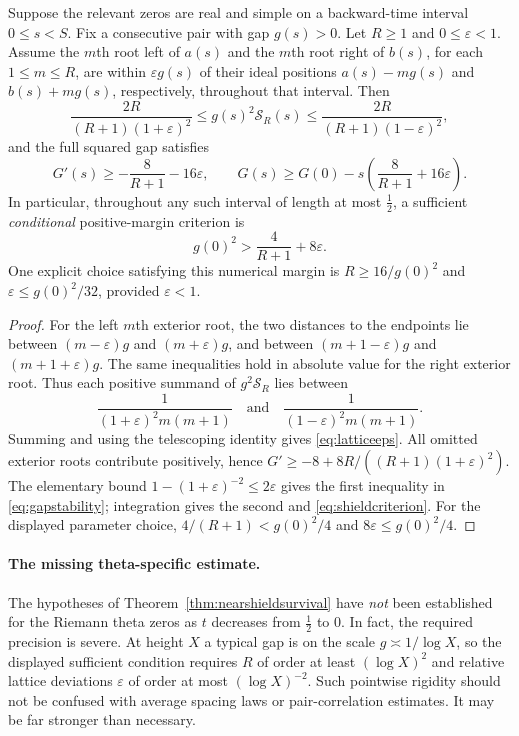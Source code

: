 \begin{theorem}
\label{thm:nearshieldsurvival}
Suppose the relevant zeros are real and simple
on a backward-time interval $0\le s<S$.
Fix a consecutive pair with gap $g(s)>0$.
Let $R\ge1$ and $0\le\varepsilon<1$.
Assume the $m$th root left of $a(s)$
and the $m$th root right of $b(s)$,
for each $1\le m\le R$, are within
$\varepsilon g(s)$ of their ideal
positions $a(s)-mg(s)$ and $b(s)+mg(s)$,
respectively, throughout that interval.
Then
\begin{equation}
\frac{2R}{(R+1)(1+\varepsilon)^2}
\le g(s)^2\mathcal S_R(s)
\le\frac{2R}{(R+1)(1-\varepsilon)^2},
\label{eq:latticeeps}
\end{equation}
and the full squared gap satisfies
\begin{equation}
\boxed{
G'(s)\ge-\frac8{R+1}-16\varepsilon,\qquad
G(s)\ge G(0)-s
\left(\frac8{R+1}+16\varepsilon\right).
}
\label{eq:gapstability}
\end{equation}
In particular, throughout any such interval of
length at most $\tfrac12$, a sufficient
\emph{conditional} positive-margin criterion is
\begin{equation}
\boxed{g(0)^2>\frac4{R+1}+8\varepsilon.}
\label{eq:shieldcriterion}
\end{equation}
One explicit choice satisfying this numerical margin is
$R\ge16/g(0)^2$ and
$\varepsilon\le g(0)^2/32$, provided $\varepsilon<1$.
\end{theorem}
\begin{proof}
For the left $m$th exterior root, the two
distances to the endpoints lie between
$(m-\varepsilon)g$ and $(m+\varepsilon)g$,
and between $(m+1-\varepsilon)g$ and
$(m+1+\varepsilon)g$.
The same inequalities hold in absolute value
for the right exterior root. Thus each
positive summand of $g^2\mathcal S_R$
lies between
\[
\frac{1}{(1+\varepsilon)^2m(m+1)}
\quad\text{and}\quad
\frac{1}{(1-\varepsilon)^2m(m+1)}.
\]
Summing and using the telescoping identity
gives \eqref{eq:latticeeps}.
All omitted exterior roots contribute
positively, hence
$G'\ge-8+8R/((R+1)(1+\varepsilon)^2)$.
The elementary bound
$1-(1+\varepsilon)^{-2}\le2\varepsilon$
gives the first inequality in
\eqref{eq:gapstability}; integration gives
the second and \eqref{eq:shieldcriterion}.
For the displayed parameter choice,
$4/(R+1)<g(0)^2/4$ and
$8\varepsilon\le g(0)^2/4$.
\end{proof}

\paragraph{The missing theta-specific estimate.}
The hypotheses of Theorem~\ref{thm:nearshieldsurvival}
have \emph{not} been established for the Riemann
theta zeros as $t$ decreases from $\tfrac12$ to $0$.
In fact, the required precision is severe.
At height $X$ a typical gap is on the scale
$g\asymp1/\log X$, so the displayed sufficient
condition requires $R$ of order at least
$(\log X)^2$ and relative lattice deviations
$\varepsilon$ of order at most $(\log X)^{-2}$.
Such pointwise rigidity should not be confused
with average spacing laws or pair-correlation
estimates. It may be far stronger than necessary.

